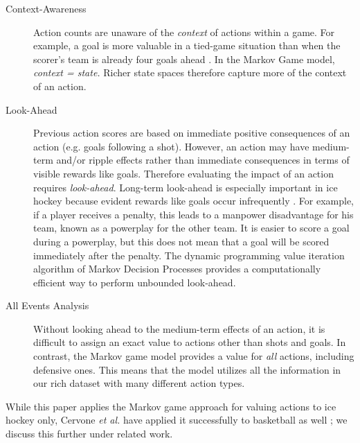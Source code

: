 \begin{description}
\item[Context-Awareness] Action counts are unaware of the {\em context} of actions within a game. For example, a goal is more valuable in a tied-game situation than when the scorer's team is already four goals ahead \citep{Pettigrew2015}. 
In the Markov Game model, \emph{context  = state.}  Richer state spaces therefore capture more of the context of an action. 
\item[Look-Ahead] Previous action scores are based on immediate positive consequences of an action (e.g. goals following a shot). However, an action may have medium-term and/or ripple effects rather than immediate consequences in terms of visible rewards like goals. Therefore evaluating the impact of an action requires {\em look-ahead}.  Long-term look-ahead is especially important in ice hockey because evident rewards like goals occur infrequently \citep{Schuckers2013}.
For example, if a player receives a penalty, this leads to a manpower disadvantage for his team, known as a powerplay for the other team.
It is easier to score a goal during a powerplay, but this does not mean that a goal will be scored immediately after the penalty. 
The dynamic programming value iteration algorithm of Markov Decision Processes provides a computationally efficient way to perform unbounded look-ahead. 
\item[All Events Analysis] Without looking ahead to the medium-term effects of an action, it is difficult to assign an exact value to actions other than shots and goals. In contrast, the Markov game model provides a value for {\em all} actions, including defensive ones. This means that the model utilizes all the information in our rich dataset with many different action types.
\end{description}

While this paper applies the Markov game approach for valuing actions to ice hockey only, Cervone {\em et al.} have applied it successfully to basketball as well \citep{Cervone2014a}; we discuss this further under related work.

